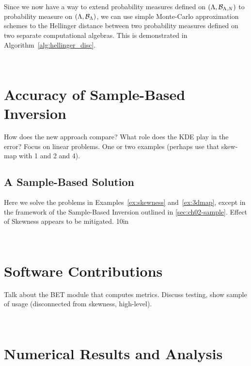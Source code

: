 Since we now have a way to extend probability measures defined on $({\Lambda}, \mathcal{B}_{{\Lambda}, N})$ to  probability measure on $({\Lambda}, \mathcal{B}_{{\Lambda}})$, we can use simple Monte-Carlo approximation schemes to the Hellinger distance between two probability measures defined on two separate computational algebras. 
This is demonstrated in Algorithm~\ref{alg:hellinger_disc}.








\
\section{Accuracy of Sample-Based Inversion}\label{sec:ch03-sample}

How does the new approach compare? What role does the KDE play in the error?
Focus on linear problems. One or two examples (perhaps use that skew-map with 1 and 2 and 4).


\subsection{A Sample-Based Solution}\label{eq:sampleskew}

Here we solve the problems in Examples~\ref{ex:skewness} and~\ref{ex:3dmap}, except in the framework of the Sample-Based Inversion outlined in \ref{sec:ch02-sample}.
Effect of Skewness appears to be mitigated.
\vfill{10in}


\
\section{Software Contributions}\label{sec:ch03-software}

Talk about the BET module that computes metrics.
Discuss testing, show sample of usage (disconnected from skewness, high-level).

\
\section{Numerical Results and Analysis}\label{sec:ch03-approx}

